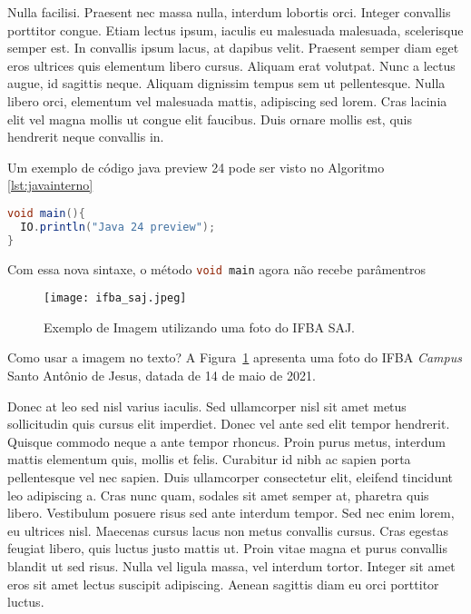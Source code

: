 \documentclass[tec, ads, scr, classic, a4paper,twoside]{ifbatcc}
\begin{document}
Nulla facilisi. Praesent nec massa nulla, interdum lobortis orci. Integer convallis porttitor congue. Etiam lectus ipsum, iaculis eu malesuada malesuada, scelerisque semper est. In convallis ipsum lacus, at dapibus velit. Praesent semper diam eget eros ultrices quis elementum libero cursus. Aliquam erat volutpat. Nunc a lectus augue, id sagittis neque. Aliquam dignissim tempus sem ut pellentesque. Nulla libero orci, elementum vel malesuada mattis, adipiscing sed lorem. Cras lacinia elit vel magna mollis ut congue elit faucibus. Duis ornare mollis est, quis hendrerit neque convallis in.

Um exemplo de código java preview 24 pode ser visto no Algoritmo \ref{lst:javainterno}
                  
\begin{lstlisting}[language=java,label=lst:javainterno,caption=Exemplo de uso do codigo java dentro no Tex]
void main(){
  IO.println("Java 24 preview");
}

\end{lstlisting}

Com essa nova sintaxe, o método \lstinline[language=Java]!void main! agora não recebe parâmentros  


\begin{figure}[!htb]
\centerline{\texttt{[image: ifba\_saj.jpeg]}}
\caption{Exemplo de Imagem utilizando uma foto do IFBA SAJ.}
\label{fig:ifba}
\end{figure}

Como usar a imagem no texto? A Figura~\ref{fig:ifba} apresenta uma foto do IFBA \textit{Campus} Santo Antônio de Jesus, datada de 14 de maio de 2021.

Donec at leo sed nisl varius iaculis. Sed ullamcorper nisl sit amet metus sollicitudin quis cursus elit imperdiet. Donec vel ante sed elit tempor hendrerit. Quisque commodo neque a ante tempor rhoncus. Proin purus metus, interdum mattis elementum quis, mollis et felis. Curabitur id nibh ac sapien porta pellentesque vel nec sapien. Duis ullamcorper consectetur elit, eleifend tincidunt leo adipiscing a. Cras nunc quam, sodales sit amet semper at, pharetra quis libero. Vestibulum posuere risus sed ante interdum tempor. Sed nec enim lorem, eu ultrices nisl. Maecenas cursus lacus non metus convallis cursus. Cras egestas feugiat libero, quis luctus justo mattis ut. Proin vitae magna et purus convallis blandit ut sed risus. Nulla vel ligula massa, vel interdum tortor. Integer sit amet eros sit amet lectus suscipit adipiscing. Aenean sagittis diam eu orci porttitor luctus.
\end{document}
